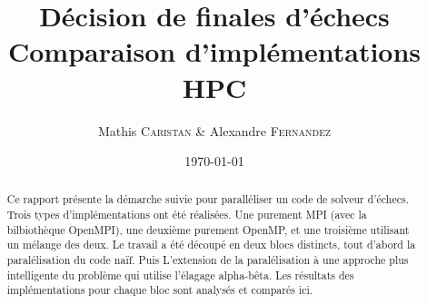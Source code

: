 \documentclass[12pt]{article}
\title{Décision de finales d'échecs\\ Comparaison d'implémentations \\ HPC} %
\author{Mathis \textsc{Caristan} \& Alexandre \textsc{Fernandez}} %
\date{\today} %
\begin{document}
\maketitle %

\begin{abstract}
    Ce rapport présente la démarche suivie pour paralléliser un code de solveur d'échecs.
    Trois types d'implémentations ont été réalisées.
    Une purement MPI (avec la bilbiothèque OpenMPI), une deuxième purement OpenMP,
    et une troisième utilisant un mélange des deux.
    Le travail a été découpé en deux blocs distincts, tout d'abord la paralélisation
    du code \og naïf\fg. Puis L'extension de la paralélisation à une approche plus
    intelligente du problème qui utilise \og l'élagage alpha-bêta\fg.
    Les résultats des implémentations pour chaque bloc sont analysés et comparés ici.
\end{abstract}

\end{document}
